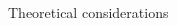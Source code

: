 \begin{block}{Theoretical considerations}
\begin{columns}
\begin{column}{0.49\textwidth}
\begin{figure}
\begin{center}
        \end{center}
      \end{figure}
    \end{column}
  \end{columns}
\end{block}
